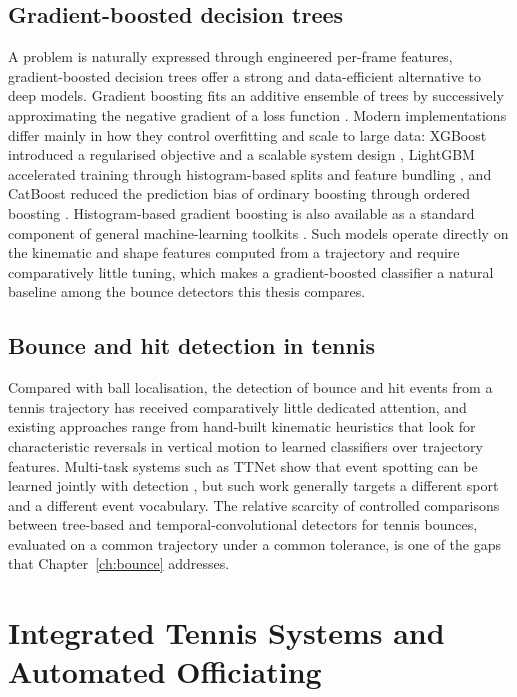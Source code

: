 \subsection{Gradient-boosted decision trees}
\label{sec:rw-gbm}

A problem is naturally expressed through engineered per-frame features,
gradient-boosted decision trees offer a strong and data-efficient alternative
to deep models. Gradient boosting fits an additive ensemble of trees by
successively approximating the negative gradient of a loss function
\cite{friedman2001gbm}. Modern implementations differ mainly in how they
control overfitting and scale to large data: XGBoost introduced a regularised
objective and a scalable system design \cite{chen2016xgboost}, LightGBM
accelerated training through histogram-based splits and feature bundling
\cite{ke2017lightgbm}, and CatBoost reduced the prediction bias of ordinary
boosting through ordered boosting \cite{prokhorenkova2018catboost}.
Histogram-based gradient boosting is also available as a standard component of
general machine-learning toolkits \cite{pedregosa2011sklearn}. Such models
operate directly on the kinematic and shape features computed from a trajectory
and require comparatively little tuning, which makes a gradient-boosted
classifier a natural baseline among the bounce detectors this thesis compares.

\subsection{Bounce and hit detection in tennis}
\label{sec:rw-bounce}

Compared with ball localisation, the detection of bounce and hit events from a
tennis trajectory has received comparatively little dedicated attention, and
existing approaches range from hand-built kinematic heuristics that look for
characteristic reversals in vertical motion to learned classifiers over
trajectory features. Multi-task systems such as TTNet show that event spotting
can be learned jointly with detection \cite{voeikov2020ttnet}, but such work
generally targets a different sport and a different event vocabulary. The
relative scarcity of controlled comparisons between tree-based and
temporal-convolutional detectors for tennis bounces, evaluated on a common
trajectory under a common tolerance, is one of the gaps that
Chapter~\ref{ch:bounce} addresses.

\section{Integrated Tennis Systems and Automated Officiating}
\label{sec:rw-systems}

